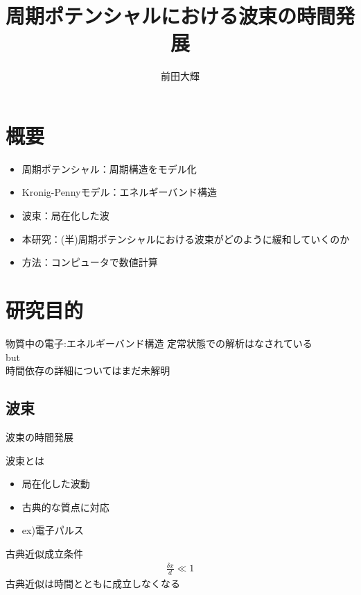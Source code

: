 \documentclass[unicode, 12pt, aspectratio=169]{beamer}
\author{前田大輝}
\title{周期ポテンシャルにおける波束の時間発展}
\begin{document}
\frame{\maketitle}
\begin{frame}
\tableofcontents
\end{frame}
\section{概要}
\frame{\insertsection}
\begin{frame}
    \begin{itemize}
      \item 周期ポテンシャル：周期構造をモデル化
      \item Kronig-Pennyモデル：エネルギーバンド構造
      \item 波束：局在化した波
      \item 本研究：(半)周期ポテンシャルにおける波束がどのように緩和していくのか
      \item 方法：コンピュータで数値計算
    \end{itemize}
\end{frame}
\section{研究目的}
\begin{frame}
   \begin{block}{物質中の電子:エネルギーバンド構造}
        定常状態での解析はなされている\\
        \alert{but}\\
        時間依存の詳細についてはまだ未解明\\
   \end{block}
\end{frame}
\subsection{波束}
\frame{\insertsubsection}
\begin{frame}{波束の時間発展}
  \begin{block}{波束とは}
    \begin{itemize}
      \item 局在化した波動
      \item 古典的な質点に対応
      \item ex)電子パルス
    \end{itemize}
  \end{block}
  \begin{block}{古典近似成立条件}
    \begin{align}
      \frac{\delta x}{d} \ll 1\label{acc}
    \end{align}
    古典近似は時間とともに成立しなくなる
  \end{block}
\end{frame}
\end{document}
